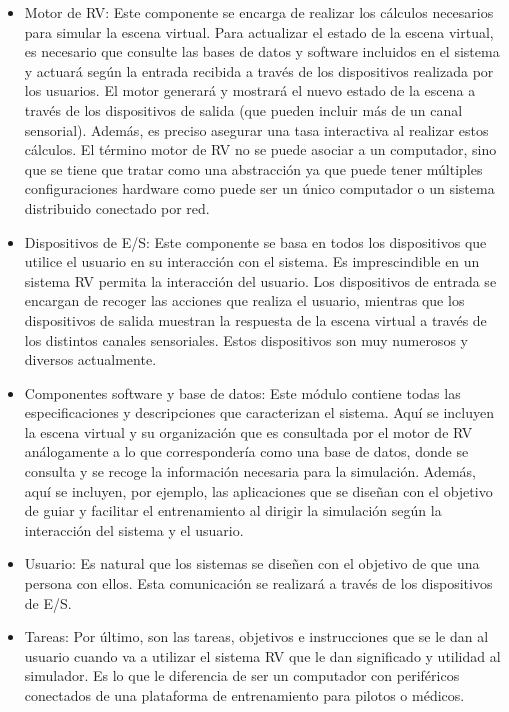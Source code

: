 \begin{itemize}
    \item Motor de \ac{RV}: Este componente se encarga de realizar los cálculos necesarios para simular la escena virtual. Para actualizar el estado de la escena virtual, es necesario que  consulte las bases de datos y software incluidos en el sistema y actuará según la entrada recibida a través de los dispositivos realizada por los usuarios. El motor generará y mostrará el nuevo estado de la escena a través de los dispositivos de salida (que pueden incluir más de un canal sensorial). Además, es preciso asegurar una tasa interactiva al realizar estos cálculos. El término motor de RV no se puede asociar a un computador, sino que se tiene que tratar como una abstracción ya que puede tener múltiples configuraciones hardware como puede ser un único computador o un sistema distribuido conectado por red.
    \item Dispositivos de \ac{E/S}: Este componente se basa en todos los dispositivos que utilice el usuario en su interacción con el sistema. Es imprescindible en un sistema  \ac{RV}  permita la interacción del usuario. Los dispositivos de entrada se encargan de recoger las acciones que realiza el usuario, mientras que los dispositivos de salida muestran la respuesta de la escena virtual a través de los distintos canales sensoriales. Estos dispositivos son muy numerosos y diversos actualmente.
    \item Componentes software y base de datos: Este módulo contiene todas las especificaciones y descripciones que caracterizan el sistema. Aquí se incluyen la escena virtual y su organización que es consultada por el motor de \ac{RV} análogamente a lo que correspondería como una base de datos, donde se consulta y se recoge la información necesaria para la simulación. Además, aquí se incluyen, por ejemplo, las aplicaciones que se diseñan con el objetivo de guiar y facilitar el entrenamiento al dirigir la simulación según la interacción del sistema y el usuario.
    \item Usuario: Es natural que los sistemas se diseñen con el objetivo de que una persona   con ellos. Esta comunicación se realizará a través de los dispositivos de \ac{E/S}. 
    \item Tareas: Por último, son las tareas, objetivos e instrucciones que se le dan al usuario cuando va a utilizar el sistema  \ac{RV} que le dan significado y utilidad al simulador. Es lo que le diferencia de ser un computador con periféricos conectados de una plataforma de entrenamiento para pilotos o médicos. 
    
\end{itemize}

